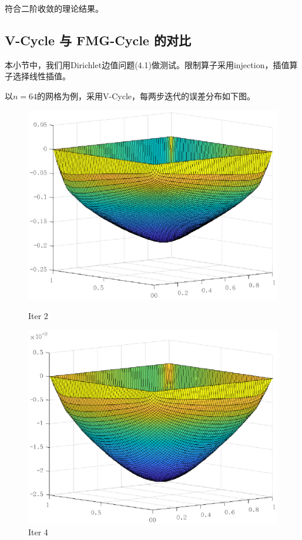 \documentclass[lang=cn,10pt]{elegantbook}
\begin{document}
符合二阶收敛的理论结果。

\subsection{V-Cycle 与 FMG-Cycle 的对比}

本小节中，我们用Dirichlet边值问题(4.1)做测试。限制算子采用injection，插值算子选择线性插值。

以$n=64$的网格为例，采用V-Cycle，每两步迭代的误差分布如下图。

\begin{figure}[H]
  \centering
  \begin{minipage}[t]{0.24\linewidth}
      \centering
      \includegraphics[width=0.8\linewidth]{figure/2-4-1.eps}
      \caption*{Iter 2}
  \end{minipage}
  \begin{minipage}[t]{0.24\linewidth}
    \centering
    \includegraphics[width=0.8\linewidth]{figure/2-4-2.eps}
    \caption*{Iter 4}
  \end{minipage}

\end{figure}
\end{document}
